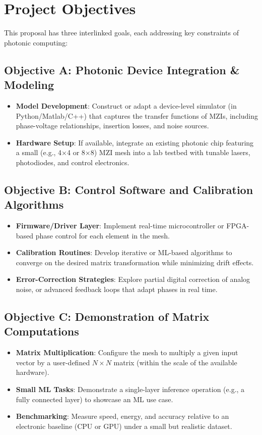 \documentclass[conference]{IEEEtran}
\begin{document}
\section{Project Objectives}
This proposal has three interlinked goals, each addressing key constraints of photonic computing:

\subsection{Objective A: Photonic Device Integration \& Modeling}
\begin{itemize}
    \item \textbf{Model Development}: Construct or adapt a device-level simulator (in Python/Matlab/C++) that captures the transfer functions of MZIs, including phase-voltage relationships, insertion losses, and noise sources.
    \item \textbf{Hardware Setup}: If available, integrate an existing photonic chip featuring a small (e.g., 4$\times$4 or 8$\times$8) MZI mesh into a lab testbed with tunable lasers, photodiodes, and control electronics.
\end{itemize}

\subsection{Objective B: Control Software and Calibration Algorithms}
\begin{itemize}
    \item \textbf{Firmware/Driver Layer}: Implement real-time microcontroller or FPGA-based phase control for each element in the mesh. 
    \item \textbf{Calibration Routines}: Develop iterative or ML-based algorithms to converge on the desired matrix transformation while minimizing drift effects.
    \item \textbf{Error-Correction Strategies}: Explore partial digital correction of analog noise, or advanced feedback loops that adapt phases in real time.
\end{itemize}

\subsection{Objective C: Demonstration of Matrix Computations}
\begin{itemize}
    \item \textbf{Matrix Multiplication}: Configure the mesh to multiply a given input vector by a user-defined $N\times N$ matrix (within the scale of the available hardware).
    \item \textbf{Small ML Tasks}: Demonstrate a single-layer inference operation (e.g., a fully connected layer) to showcase an ML use case.
    \item \textbf{Benchmarking}: Measure speed, energy, and accuracy relative to an electronic baseline (CPU or GPU) under a small but realistic dataset.
\end{itemize}
\end{document}
